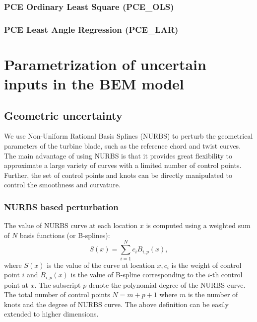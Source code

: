 \documentclass[review]{elsarticle}
\numberwithin{equation}{section}
\numberwithin{equation}{section}
\begin{document}
\subsubsection{PCE Ordinary Least Square (PCE\_OLS)}
\subsubsection{PCE Least Angle Regression (PCE\_LAR)}
\section{Parametrization of uncertain inputs in the BEM model}
\subsection{Geometric uncertainty}
We use Non-Uniform Rational Basis Splines (NURBS) \cite{rogers2000} to perturb the geometrical parameters of the turbine blade, such as the reference chord and twist curves. The main advantage of using NURBS is that it provides great flexibility to approximate a large variety of curves with a limited number of control points. Further, the set of control points and knots can be directly manipulated to control the smoothness and curvature.

\subsubsection{NURBS based perturbation}
The value of NURBS curve at each location $x$ is computed using a weighted sum of $N$ basis functions (or B-splines):
\begin{equation}\label{NURB_curve}
S(x)  = \sum_{i=1}^{N} c_i B_{i,p}(x),
\end{equation}
where $S(x)$ is the value of the curve at location $x, c_i$ is the weight of control point $i$ and $B_{i,p}(x)$ is the value of B-spline corresponding to the $i$-th control point at $x$. The subscript $p$ denote the polynomial degree of the NURBS curve. The total number of control points $N = m+p+1$ where $m$ is the number of knots  and the degree of NURBS curve. The above definition can be easily extended to higher dimensions. 
\end{document}
